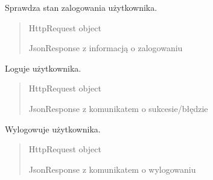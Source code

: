 \documentclass[letterpaper,11pt,polish]{sphinxmanual}
\begin{document}
\begin{fulllineitems}
\label{\detokenize{mainApp:mainApp.views.islogin}}
\pysigstartsignatures
{}
\pysigstopsignatures
\sphinxAtStartPar
Sprawdza stan zalogowania użytkownika.
\begin{quote}\begin{description}
\sphinxAtStartPar
{} \textendash{} HttpRequest object

\sphinxAtStartPar
JsonResponse z informacją o zalogowaniu

\end{description}\end{quote}

\end{fulllineitems}


\begin{fulllineitems}
\label{\detokenize{mainApp:mainApp.views.login_view}}
\pysigstartsignatures
{}
\pysigstopsignatures
\sphinxAtStartPar
Loguje użytkownika.
\begin{quote}\begin{description}
\sphinxAtStartPar
{} \textendash{} HttpRequest object

\sphinxAtStartPar
JsonResponse z komunikatem o sukcesie/błędzie

\end{description}\end{quote}

\end{fulllineitems}


\begin{fulllineitems}
\label{\detokenize{mainApp:mainApp.views.logout_view}}
\pysigstartsignatures
{}
\pysigstopsignatures
\sphinxAtStartPar
Wylogowuje użytkownika.
\begin{quote}\begin{description}
\sphinxAtStartPar
{} \textendash{} HttpRequest object

\sphinxAtStartPar
JsonResponse z komunikatem o wylogowaniu

\end{description}\end{quote}

\end{fulllineitems}
\end{document}
